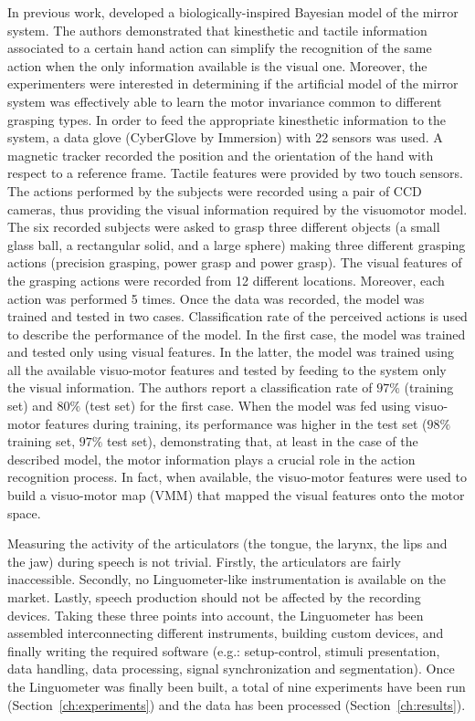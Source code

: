 In previous work,
\citet{metta.etal:2006} developed a biologically-inspired Bayesian model of
the mirror system.
The authors demonstrated that kinesthetic and tactile information associated to
a certain hand action can simplify the recognition of the same action when the
only information available is the visual one.
Moreover, the experimenters were interested in determining if the artificial
model
of the mirror system was effectively able to learn the motor invariance common
to different grasping types.
In order to feed the appropriate kinesthetic information to the system, a data
glove (CyberGlove by Immersion) with 22 sensors was used.
A magnetic tracker recorded the position and the orientation of the hand with
respect to a reference frame.
Tactile features were provided by two touch sensors. The actions performed by
the subjects were recorded using a pair of CCD cameras, thus providing the
visual information required by the visuomotor model. 
The six recorded subjects were asked to grasp three different objects 
(a small glass ball, a rectangular solid, and a large sphere) making three
different grasping actions (precision grasping, power grasp and power
grasp).
The visual features of the grasping actions were recorded from 12 different
locations. Moreover, each action was performed 5 times.
Once the data was recorded, the model was
trained and tested in two cases. Classification rate of the perceived actions is
used to describe the performance of the model.
In the first case, the model was trained and tested only using visual
features.
In the latter, the model was trained using all the available visuo-motor 
features and tested by feeding to the system only the visual
information.
The authors report a classification rate of $97\%$ (training set) and $80\%$
(test set) for the first case. 
When the model was fed using visuo-motor features during training, its
performance was higher in the test set ($98\%$ training set, $97\%$ test 
set), demonstrating that, at least in the case of the described model, the
motor information plays a crucial role in the action recognition process.
In fact, when available, the visuo-motor features were used to build a
visuo-motor map (VMM) that mapped the visual features onto the motor space.

Measuring the activity of the articulators (the tongue, the larynx, the lips and
the jaw) during speech is not trivial. 
Firstly, the articulators are fairly inaccessible.
Secondly, no Linguometer-like instrumentation is available on the market.
Lastly, speech production should not be affected by the recording devices.
Taking these three points into account, the Linguometer has been assembled 
interconnecting different instruments, building custom devices, and finally
writing the required software (e.g.: setup-control, stimuli presentation, data
handling, data processing, signal synchronization and segmentation).
Once the Linguometer was finally been built, a total of nine
experiments have been run (Section~\ref{ch:experiments}) and the data has been
processed (Section~\ref{ch:results}).\\

